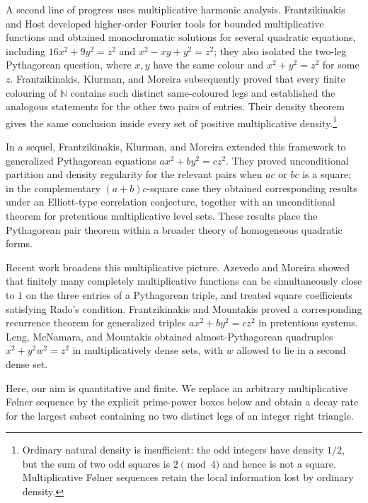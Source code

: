 \documentclass[twoside]{aomart}
\theoremstyle{paperplain}
\theoremstyle{paperdefinition}
\newcommand{\N}{\mathbb N}
\numberwithin{equation}{section}
\begin{document}
A second line of progress uses multiplicative harmonic analysis.
Frantzikinakis and Host \cite[Corollary~2.8 and Problem~3]{FrantzikinakisHost}
developed higher-order Fourier tools for bounded multiplicative functions
and obtained monochromatic solutions for several quadratic equations,
including $16x^2+9y^2=z^2$ and $x^2-xy+y^2=z^2$; they also isolated the
two-leg Pythagorean question, where $x,y$ have the same colour and
$x^2+y^2=z^2$ for some $z$.  Frantzikinakis, Klurman, and Moreira
\cite[Theorems~1.1--1.2]{FKM} subsequently proved that every finite
colouring of $\N$ contains such distinct same-coloured legs and established
the analogous statements for the other two pairs of entries.  Their
density theorem gives the same conclusion inside every set of positive
multiplicative density.\footnote{Ordinary natural density is insufficient: the
odd integers have density $1/2$, but the sum of two odd squares is
$2\pmod 4$ and hence is not a square.  Multiplicative F\o lner sequences
retain the local information lost by ordinary density.}

In a sequel, Frantzikinakis, Klurman, and Moreira
\cite[Theorems~1.2--1.4 and 1.9--1.10]{FKMgeneralized} extended this
framework to generalized Pythagorean equations
$ax^2+by^2=cz^2$.  They proved unconditional partition and density
regularity for the relevant pairs when $ac$ or $bc$ is a square; in the
complementary $(a+b)c$-square case they obtained corresponding results
under an Elliott-type correlation conjecture, together with an unconditional
theorem for pretentious multiplicative level sets.  These results place the
Pythagorean pair theorem within a broader theory of homogeneous quadratic
forms.

Recent work broadens this multiplicative picture.  Azevedo and Moreira
\cite{AzevedoMoreira} showed that finitely many completely multiplicative
functions can be simultaneously close to $1$ on the three entries of a
Pythagorean triple, and treated square coefficients satisfying Rado's
condition.  Frantzikinakis and Mountakis \cite{FrantzikinakisMountakis} proved a
corresponding recurrence theorem for generalized triples
$ax^2+by^2=cz^2$ in pretentious systems. Leng, McNamara, and Mountakis \cite{LengMcNamaraMountakis}
obtained almost-Pythagorean quadruples $x^2+y^2w^2=z^2$ in
multiplicatively dense sets, with $w$ allowed to lie in a second dense set.

Here, our aim is quantitative and finite.  We replace an arbitrary
multiplicative F\o lner sequence by the explicit prime-power boxes below
and obtain a decay rate for the largest subset containing no two distinct
legs of an integer right triangle.
\end{document}
